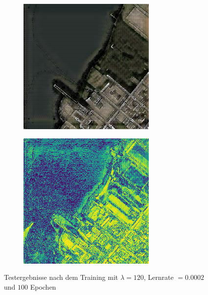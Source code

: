 \begin{figure}[ht]
\begin{subfigure}[t]{.14\textwidth}
  \end{subfigure}
  \begin{subfigure}[t]{.14\textwidth}
    \centering
    \includegraphics[width=\linewidth]{images/cycleGanResults/Satelite8_Ld120_E100_E0002.jpg}
  \end{subfigure}
  \begin{subfigure}[t]{.14\textwidth}
    \centering
    \includegraphics[width=\linewidth]{images/cycleGanResults/Satelite1_diff.png}
  \end{subfigure}
  \caption{Testergebnisse nach dem Training mit $\lambda=120$, Lernrate $=0.0002$ und $100$ Epochen}
  \label{evaluation:cycleGan_Testergebnisse}
\end{figure}

